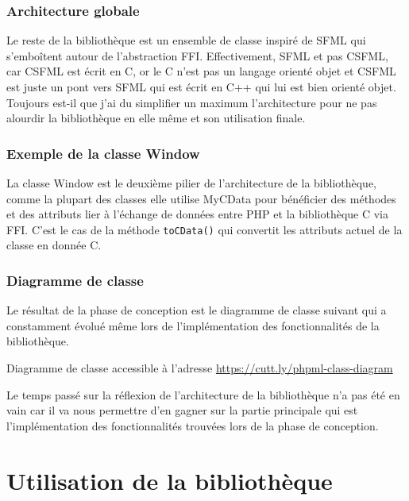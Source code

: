 \documentclass[11pt,a4paper,krantz2,11pt,oneside]{krantz}
\begin{document}
\hypertarget{architecture-globale}{%
\subsection{Architecture globale}\label{architecture-globale}}

Le reste de la bibliothèque est un ensemble de classe inspiré de SFML qui s'emboîtent autour de l'abstraction FFI. Effectivement, SFML et pas CSFML, car CSFML est écrit en C, or le C n'est pas un langage orienté objet et CSFML est juste un pont vers SFML qui est écrit en C++ qui lui est bien orienté objet. Toujours est-il que j'ai du simplifier un maximum l'architecture pour ne pas alourdir la bibliothèque en elle même et son utilisation finale.

\hypertarget{exemple-de-la-classe-window}{%
\subsection{Exemple de la classe Window}\label{exemple-de-la-classe-window}}

La classe Window est le deuxième pilier de l'architecture de la bibliothèque, comme la plupart des classes elle utilise MyCData pour bénéficier des méthodes et des attributs lier à l'échange de données entre PHP et la bibliothèque C via FFI. C'est le cas de la méthode \texttt{toCData()} qui convertit les attributs actuel de la classe en donnée C.

\hypertarget{diagramme-de-classe}{%
\subsection{Diagramme de classe}\label{diagramme-de-classe}}

Le résultat de la phase de conception est le diagramme de classe suivant qui a constamment évolué même lors de l'implémentation des fonctionnalités de la bibliothèque.

\label{fig:class-diagramm}Diagramme de classe accessible à l'adresse \url{https://cutt.ly/phpml-class-diagram}

Le temps passé sur la réflexion de l'architecture de la bibliothèque n'a pas été en vain car il va nous permettre d'en gagner sur la partie principale qui est l'implémentation des fonctionnalités trouvées lors de la phase de conception.

\hypertarget{utils}{%
\chapter{Utilisation de la bibliothèque}\label{utils}}
\end{document}
